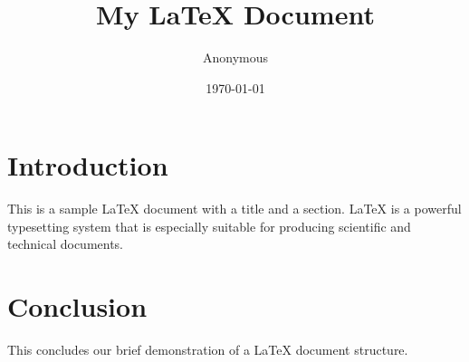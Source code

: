 \documentclass{article}
\title{My LaTeX Document}
\author{Anonymous}
\date{\today}
\begin{document}
\maketitle

\section{Introduction}
This is a sample LaTeX document with a title and a section. LaTeX is a powerful typesetting system that is especially suitable for producing scientific and technical documents.

\section{Conclusion}
This concludes our brief demonstration of a LaTeX document structure.
\end{document}
